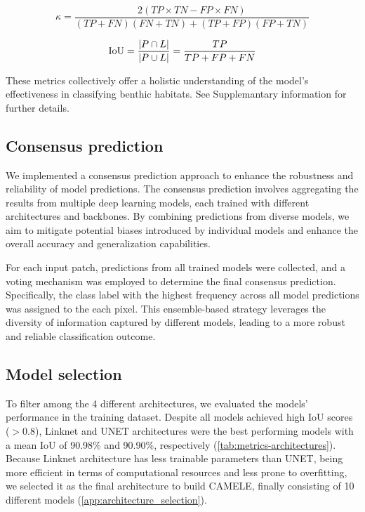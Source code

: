 \begin{equation}\label{eq:kappa}
    \kappa=\frac{2\left(TP\times TN - FP\times FN\right)}{(TP + FN)(FN + TN) +
        (TP + FP)(FP
        + TN)}
\end{equation}

\begin{equation}\label{eq:IoU}
    \text{IoU} = \frac{\abs{P\cap L}}{\abs{P\cup L}}=\frac{TP}{TP + FP + FN}
\end{equation}

These metrics collectively offer a holistic understanding of the model's
effectiveness in classifying benthic habitats. See Supplemantary information
for further details.

\subsection{Consensus prediction}

We implemented a consensus prediction approach to enhance the robustness and
reliability of model predictions. The consensus prediction involves aggregating
the results from multiple deep learning models, each trained with different
architectures and backbones. By combining predictions from diverse models, we
aim to mitigate potential biases introduced by individual models and enhance
the overall accuracy and generalization capabilities.

For each input patch, predictions from all trained models were collected, and a
voting mechanism was employed to determine the final consensus prediction.
Specifically, the class label with the highest frequency across all model
predictions was assigned to the each pixel. This ensemble-based strategy
leverages the diversity of information captured by different models, leading to
a more robust and reliable classification outcome.

\subsection{Model selection}

To filter among the 4 different architectures, we evaluated the models'
performance in the training dataset. Despite all models achieved high IoU
scores ($> 0.8$), Linknet and UNET architectures were the best performing
models with a mean IoU of 90.98\% and 90.90\%, respectively
(\cref{tab:metrics-architectures}). Because Linknet architecture has less
trainable parameters than UNET, being more efficient in terms of computational
resources and less prone to overfitting, we selected it as the final
architecture to build CAMELE, finally consisting of 10 different models
(\cref{app:architecture_selection}).

